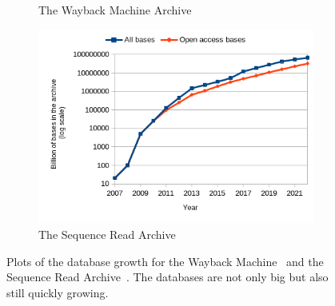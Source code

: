 
\begin{figure}
    \centering
    \begin{subfigure}[b]{0.45\textwidth}
        \caption{The Wayback Machine Archive}
    \end{subfigure}
    \begin{subfigure}[b]{0.49\textwidth}
    \includegraphics[width=\textwidth]{0_sheets/sra_growth.png}
    \caption{The Sequence Read Archive}
    \end{subfigure}
    \caption{Plots of the database growth for the Wayback Machine~\cite{web-archive-growth} and the Sequence Read Archive~\cite{sra}. The databases are not only big but also still quickly growing.}
\end{figure}

